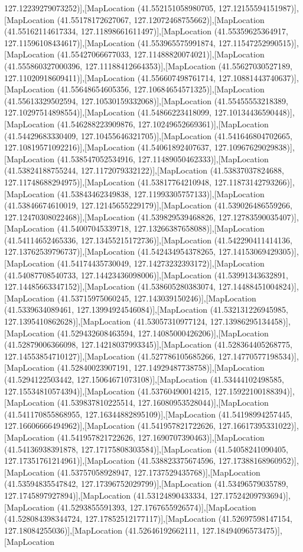 127.12239279073252)],[MapLocation (41.552151058980705, 127.12155594151987)],[MapLocation (41.55178172627067, 127.12072468755662)],[MapLocation (41.55162114617334, 127.11898661611497)],[MapLocation (41.55359625364917, 127.11596108434617)],[MapLocation (41.553965575991874, 127.11547252990515)],[MapLocation (41.55427066677033, 127.11488820074021)],[MapLocation (41.555860327000396, 127.11188412664353)],[MapLocation (41.55627030527189, 127.11020918609411)],[MapLocation (41.556607498761714, 127.10881443740637)],[MapLocation (41.55648654605356, 127.10684654571325)],[MapLocation (41.55613329502594, 127.10530159332068)],[MapLocation (41.55455553218389, 127.10297514898554)],[MapLocation (41.54866223418099, 127.10134436590448)],[MapLocation (41.546288223909876, 127.10249652669361)],[MapLocation (41.54429683330409, 127.10455646321705)],[MapLocation (41.541646804702665, 127.10819571092216)],[MapLocation (41.54061892407637, 127.10967629029838)],[MapLocation (41.538547052534916, 127.11489050462333)],[MapLocation (41.53824188755244, 127.1172079332122)],[MapLocation (41.53837037824688, 127.11748688294975)],[MapLocation (41.53817764210948, 127.11873142793266)],[MapLocation (41.53843462349838, 127.11993305757133)],[MapLocation (41.53846674610019, 127.12145655229179)],[MapLocation (41.539026486559266, 127.12470308022468)],[MapLocation (41.539829539468826, 127.12783590035407)],[MapLocation (41.54007045339718, 127.13266387658088)],[MapLocation (41.54114652465336, 127.13455215172736)],[MapLocation (41.542290411414136, 127.13762539796737)],[MapLocation (41.542434954378265, 127.14153069429305)],[MapLocation (41.54174435730049, 127.14273232393172)],[MapLocation (41.54087708540733, 127.14423436098006)],[MapLocation (41.53991343632891, 127.14485663347152)],[MapLocation (41.538605280383074, 127.14488451004824)],[MapLocation (41.53715975060245, 127.143039150246)],[MapLocation (41.5339634089461, 127.13994924546084)],[MapLocation (41.532131226945985, 127.1395410862628)],[MapLocation (41.53057310977124, 127.13986295134458)],[MapLocation (41.529432608463594, 127.14085000426206)],[MapLocation (41.52879006366098, 127.14218037993345)],[MapLocation (41.528364405268775, 127.14553854710127)],[MapLocation (41.527786105685266, 127.14770577198534)],[MapLocation (41.52840023907191, 127.14929487738758)],[MapLocation (41.5294122503442, 127.15064671073108)],[MapLocation (41.53444102498585, 127.15534810574394)],[MapLocation (41.53760490014215, 127.15922100188394)],[MapLocation (41.539837810225514, 127.16080953528044)],[MapLocation (41.541170855868955, 127.16344882895109)],[MapLocation (41.54198994257445, 127.16606666494962)],[MapLocation (41.541957821722626, 127.16617395331022)],[MapLocation (41.541957821722626, 127.1690707390463)],[MapLocation (41.54136938391878, 127.17175808303584)],[MapLocation (41.54058241090405, 127.17351761214961)],[MapLocation (41.538823375674596, 127.17388168960952)],[MapLocation (41.53757058928947, 127.1737529435768)],[MapLocation (41.53594835547842, 127.17396752029799)],[MapLocation (41.53496579035789, 127.1745897927894)],[MapLocation (41.53124890433334, 127.17524209793694)],[MapLocation (41.5293855591393, 127.1767655926574)],[MapLocation (41.528084398344724, 127.17852512177117)],[MapLocation (41.52697598147154, 127.18084255036)],[MapLocation (41.52646192662111, 127.18494096573475)],[MapLocation 